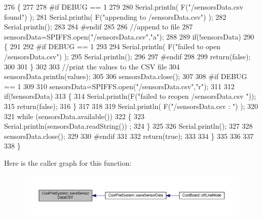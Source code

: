 \begin{DoxyCode}
276     \{
277 
278 \textcolor{preprocessor}{    #if DEBUG == 1}
279     
280         Serial.println( F(\textcolor{stringliteral}{"/sensorsData.csv  found"}) );
281         Serial.println( F(\textcolor{stringliteral}{"appending to /sensorsData.csv"}) );
282         Serial.println();
283     
284 \textcolor{preprocessor}{    #endif}
285 
286         \textcolor{comment}{//append to file}
287         sensorsData=SPIFFS.open(\textcolor{stringliteral}{"/sensorsData.csv"},\textcolor{stringliteral}{"a"});
288         
289         \textcolor{keywordflow}{if}(!sensorsData)
290         \{
291         
292 \textcolor{preprocessor}{        #if DEBUG == 1}
293             
294             Serial.println( F(\textcolor{stringliteral}{"failed to open /sensorsData.csv"}) );
295             Serial.println();
296 
297 \textcolor{preprocessor}{        #endif}
298             
299             \textcolor{keywordflow}{return}(\textcolor{keyword}{false});
300         
301         \}
302 
303         \textcolor{comment}{//print the values to the CSV file}
304         sensorsData.println(values);
305         
306         sensorsData.close();
307 
308 \textcolor{preprocessor}{    #if DEBUG == 1}
309 
310         sensorsData=SPIFFS.open(\textcolor{stringliteral}{"/sensorsData.csv"},\textcolor{stringliteral}{"r"});
311         
312         \textcolor{keywordflow}{if}(!sensorsData)
313         \{
314             Serial.println(F(\textcolor{stringliteral}{"failed to reopen /sensorsData.csv "}));
315             \textcolor{keywordflow}{return}(\textcolor{keyword}{false});      
316         \}
317 
318         
319         Serial.println( F(\textcolor{stringliteral}{"/sensorsData.csv : "}) );
320 
321         \textcolor{keywordflow}{while} (sensorsData.available()) 
322         \{
323             Serial.println(sensorsData.readString()) ;
324         \}
325         
326         Serial.println();
327         
328         sensorsData.close();
329         
330 \textcolor{preprocessor}{    #endif      }
331         
332         \textcolor{keywordflow}{return}(\textcolor{keyword}{true});
333     
334     \}   
335 
336 
337 
338 \}
\end{DoxyCode}
Here is the caller graph for this function\+:\nopagebreak
\begin{figure}[H]
\begin{center}
\leavevmode
\includegraphics[width=350pt]{classCoolFileSystem_af5a51e2b9bb6e7e7edf75a508fe75f82_icgraph}
\end{center}
\end{figure}
\mbox{\label{classCoolFileSystem_a32dad79ae80182a83e2e8f52286b7c7b}} 
